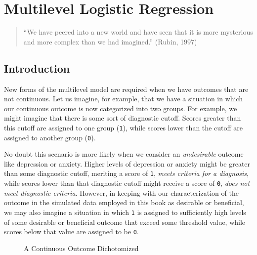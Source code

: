 \documentclass[
  letterpaper,
  DIV=11,
  numbers=noendperiod]{scrreprt}
\begin{document}

\chapter{Multilevel Logistic Regression}\label{sec-logistic}

\begin{quote}
``We have peered into a new world and have seen that it is more
mysterious and more complex than we had imagined.'' (Rubin, 1997)
\end{quote}

\section{Introduction}\label{introduction-2}

New forms of the multilevel model are required when we have outcomes
that are not continuous. Let us imagine, for example, that we have a
situation in which our continuous outcome is now categorized into two
groups. For example, we might imagine that there is some sort of
diagnostic cutoff. Scores greater than this cutoff are assigned to one
group (\texttt{1}), while scores lower than the cutoff are assigned to
another group (\texttt{0}).

No doubt this scenario is more likely when we consider an
\emph{undesirable} outcome like depression or anxiety. Higher levels of
depression or anxiety might be greater than some diagnostic cutoff,
meriting a score of \texttt{1}, \emph{meets criteria for a diagnosis},
while scores lower than that diagnostic cutoff might receive a score of
\texttt{0}, \emph{does not meet diagnostic criteria}. However, in
keeping with our characterization of the outcome in the simulated data
employed in this book as desirable or beneficial, we may also imagine a
situation in which \texttt{1} is assigned to sufficiently high levels of
some desirable or beneficial outcome that exceed some threshold value,
while scores below that value are assigned to be \texttt{0}.

\begin{figure}


\caption{\label{fig-dichotomized}A Continuous Outcome Dichotomized}

\end{figure}%
\end{document}
